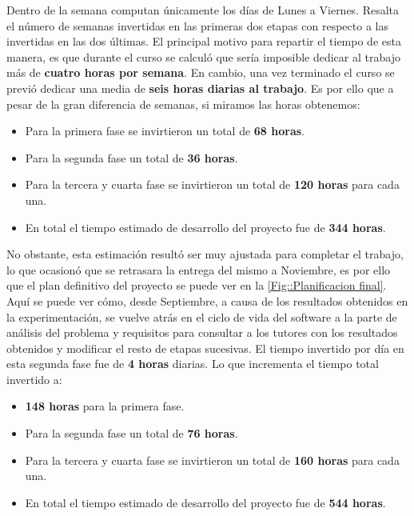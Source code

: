     \medskip

    \noindent Dentro de la semana computan únicamente los días de Lunes a Viernes. Resalta el número de semanas invertidas en las primeras dos etapas con respecto a las invertidas en las dos últimas. El principal motivo para repartir el tiempo de esta manera, es que durante el curso se calculó que sería imposible dedicar al trabajo más de \textbf{cuatro horas por semana}. En cambio, una vez terminado el curso se previó dedicar una media de \textbf{seis horas diarias al trabajo}. Es por ello que a pesar de la gran diferencia de semanas, si miramos las horas obtenemos:
    
    \begin{itemize}
        \item Para la primera fase se invirtieron un total de \textbf{68 horas}.
        \item Para la segunda fase un total de \textbf{36 horas}.
        \item Para la tercera y cuarta fase se invirtieron un total de \textbf{120 horas} para cada una.
        \item En total el tiempo estimado de desarrollo del proyecto fue de \textbf{344 horas}.
    \end{itemize}
        
    \noindent No obstante, esta estimación resultó ser muy ajustada para completar el trabajo, lo que ocasionó que se retrasara la entrega del mismo a Noviembre, es por ello que el plan definitivo del proyecto se puede ver en la \autoref{Fig::Planificacion final}. Aquí se puede ver cómo, desde Septiembre, a causa de los resultados obtenidos en la experimentación, se vuelve atrás en el ciclo de vida del software a la parte de análisis del problema y requisitos para consultar a los tutores con los resultados obtenidos y modificar el resto de etapas sucesivas. El tiempo invertido por día en esta segunda fase fue de \textbf{4 horas} diarias. Lo que incrementa el tiempo total invertido a:

    \begin{itemize}
        \item \textbf{148 horas} para la primera fase.
        \item Para la segunda fase un total de \textbf{76 horas}.
        \item Para la tercera y cuarta fase se invirtieron un total de \textbf{160 horas} para cada una.
        \item En total el tiempo estimado de desarrollo del proyecto fue de \textbf{544 horas}.
    \end{itemize}

